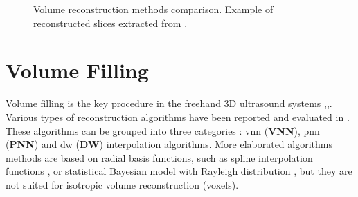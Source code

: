 \documentclass[12pt,journal,compsoc]{IEEEtran}
\begin{document}
\begin{figure}[hb!]
\centering
{}
\hfil
{}
\hfil
{}
\hfil
{}
\caption{Volume reconstruction methods comparison. Example of reconstructed slices extracted from \textbf{\cite{2}}.}
\label{algo_comparison}
\end{figure}

\section{Volume Filling}

Volume filling is the key procedure in the freehand 3D ultrasound systems \textbf{\cite{3}},\textbf{\cite{4}},\textbf{\cite{6}}. Various types of reconstruction algorithms have been reported and evaluated in\textbf{ \cite{10}}. These algorithms can be grouped into three categories : \acl{vnn} (\textbf{VNN}), \acl{pnn} (\textbf{PNN}) and \acl{dw} (\textbf{DW}) interpolation algorithms. 
More elaborated algorithms methods are based on radial basis functions, such as spline interpolation functions\textbf{ \cite{11}}, or statistical Bayesian model with Rayleigh distribution\textbf{ \cite{12}}, but they are not suited for isotropic volume reconstruction (voxels).\par
\end{document}
